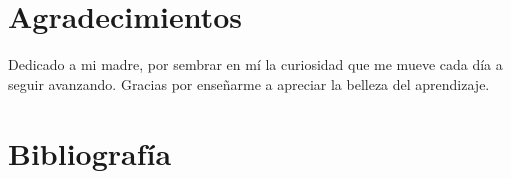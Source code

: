\documentclass[a4paper,11pt,twoside,openright,spanish]{book}
\makeatletter
\def\cleardoublepage{\clearpage\if@twoside \ifodd\c@page\else
  \vspace*{\fill}
    \thispagestyle{empty}
    \newpage
    \if@twocolumn\hbox{}\newpage\fi\fi\fi}
\makeatother
\begin{document}
\chapter*{Agradecimientos}
\label{sec:Agradecimientos}

\noindent Dedicado a mi madre, por sembrar en mí la curiosidad que me mueve cada día a seguir avanzando. Gracias por enseñarme a apreciar la belleza del aprendizaje.








\tableofcontents
\listoffigures
\listoftables










\cleardoublepage
{}
\chapter*{Bibliografía}



\newpage
\newpage

\printglossary[type=\acronymtype]

\appendix

% 

\newpage
\newpage
\end{document}
